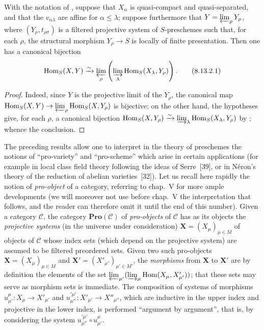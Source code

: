 \begin{corollary}[8.13.2]
\label{IV.8.13.2}
With the notation of , suppose that $X_\alpha$ is quasi-compact and quasi-separated, and that the $v_{\alpha\lambda}$ are affine for $\alpha\leqslant\lambda$; suppose furthermore that $Y=\varprojlim_\rho Y_\rho$, where $(Y_\rho,t_{\rho\sigma})$ is a filtered projective system of $S$-preschemes such that, for each $\rho$, the structural morphism $Y_\rho\to S$ is locally of finite presentation.
Then one has a canonical bijection
\begin{equation}
\label{IV.8.13.2.1}
\operatorname{Hom}_S(X,Y)\xrightarrow{\sim}\varprojlim_\rho\left(\varinjlim_\lambda\operatorname{Hom}_S(X_\lambda,Y_\rho)\right). \tag{8.13.2.1}
\end{equation}
\end{corollary}

\begin{proof}
Indeed, since $Y$ is the projective limit of the $Y_\rho$, the canonical map $\operatorname{Hom}_S(X,Y)\to\varprojlim_\rho\operatorname{Hom}_S(X,Y_\rho)$ is bijective; on the other hand, the hypotheses give, for each $\rho$, a canonical bijection $\operatorname{Hom}_S(X,Y_\rho)\xrightarrow{\sim}\varinjlim_\lambda\operatorname{Hom}_S(X_\lambda,Y_\rho)$ by ; whence the conclusion.
\end{proof}

\begin{env}[8.13.3]
\label{IV.8.13.3}
The preceding results allow one to interpret in the theory of preschemes the notions of ``pro-variety'' and ``pro-scheme'' which arise in certain applications (for example in local class field theory following the ideas of Serre~[39], or in N\'eron's theory of the reduction of
abelian varieties~[32]).
Let us recall here rapidly the notion of \emph{pro-object} of a category, referring to chap.~V for more ample developments (we will moreover not use before chap.~V the interpretation that follows, and the reader can therefore omit it until the end of this number).
Given a category $\mathcal{C}$, the category $\mathbf{Pro}(\mathcal{C})$ of \emph{pro-objects} of $\mathcal{C}$ has as its objects the \emph{projective systems} (in the universe under consideration) $\mathbf{X}=(X_\mu)_{\mu\in M}$ of objects of $\mathcal{C}$ whose index sets (which depend on the projective system) are assumed to be filtered preordered sets.
Given two such pro-objects $\mathbf{X}=(X_\mu)_{\mu\in M}$ and $\mathbf{X}'=(X'_{\mu'})_{\mu'\in M'}$, the \emph{morphisms} from $\mathbf{X}$ to $\mathbf{X}'$ are by definition the elements of the set $\varprojlim_{\mu'}(\varinjlim_\mu\operatorname{Hom}(X_\mu,X'_{\mu'}))$; that these sets may serve as morphism sets is immediate. The composition of systems of morphisms $u_{\mu'}^\mu:X_\mu\to X'_{\mu'}$ and $u_{\mu''}^{\prime\mu'}:X'_{\mu'}\to X''_{\mu''}$, which are inductive in the upper index and projective in the lower index, is performed ``argument by argument'', that is, by considering the system $u_{\mu''}^{\prime\mu'}\circ u_{\mu'}^\mu$.
\end{env}

